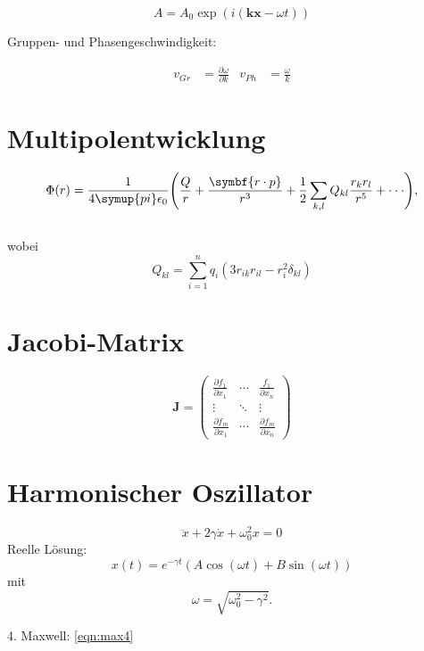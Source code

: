 \documentclass{scrartcl}
\begin{document}
\begin{equation}
  A=A_0\exp (i({\symbf{kx}-\omega t}))  %
\end{equation}

Gruppen- und Phasengeschwindigkeit:

\begin{align}
  v_{Gr} &=\frac{\partial\omega}{\partial k} &
  v_{Ph} &= \frac{\omega}{k}
\end{align}

\section{Multipolentwicklung}
\begin{equation}
  \Phi(r) = \frac{1}{4\symup{pi}\epsilon_0}\Biggl(\frac{Q}{r} +
  \frac{\symbf{r\cdot p}} {r^3} + \frac{1}{2} \sum_{k,l}
  Q_{kl}\frac{r_k r_l}{r^5} + \cdot\cdot\cdot \Biggr),
\end{equation} \\
wobei
\begin{equation*}
  Q_{kl}= \sum_{i=1}^n q_i (3r_{ik} r_{il} - r_i^2 \delta_{kl})
\end{equation*}
\section{Jacobi-Matrix}

\begin{equation}
  \symbf{J}=
  \begin{pmatrix}
    \frac{\partial f_1}{\partial x_1} & \cdots & \frac{f_1}{\partial x_n} \\
    \vdots & \ddots & \vdots \\
    \frac{\partial f_m} {\partial x_1} & \cdots & \frac{\partial f_m}{\partial x_n}
  \end{pmatrix}
\end{equation}

\section{Harmonischer Oszillator}
\begin{equation}
  \ddot{x} + 2\gamma\dot{x} +\omega_0^2x= 0
\end{equation}
Reelle Lösung:
\begin{equation}
  x(t)= e^{-\gamma t}
(A\cos{(\omega t)} + B\sin{(\omega t)})
\end{equation}
mit
\begin{equation}
  \omega = \sqrt{\omega_0^2-\gamma^2}.
\end{equation}

4. Maxwell: \eqref{eqn:max4}
\end{document}
